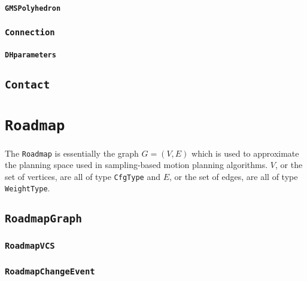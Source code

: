 \paragraph{\texttt{GMSPolyhedron}}

\subsubsection{\texttt{Connection}}

\paragraph{\texttt{DHparameters}}

\subsection{\texttt{Contact}}

\section{\texttt{Roadmap}}

The \texttt{Roadmap} is essentially the graph $G=(V, E)$ which is used to
approximate the planning space used in sampling-based motion planning
algorithms. $V$, or the set of vertices, are all of type \texttt{CfgType} and
$E$, or the set of edges, are all of type \texttt{WeightType}.

\subsection{\texttt{RoadmapGraph}}

\subsubsection{\texttt{RoadmapVCS}}

\subsubsection{\texttt{RoadmapChangeEvent}}

